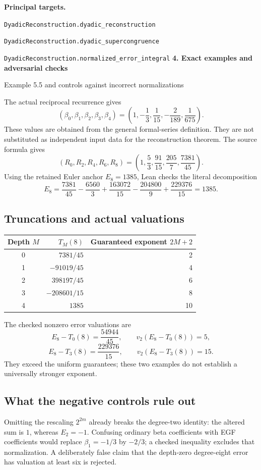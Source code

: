 \documentclass[11pt]{article}
\newcommand{\target}[1]{{\footnotesize\texttt{#1}}}
\newcommand{\pageheading}[2]{{\Large\bfseries\color{ink}#1}\par{\small #2}\par\medskip}
\begin{document}
\textbf{Principal targets.}\par
\target{DyadicReconstruction.dyadic\_reconstruction}\par
\target{DyadicReconstruction.dyadic\_supercongruence}\par
\target{DyadicReconstruction.normalized\_error\_integral}
\newpage
\pageheading{4. Exact examples and adversarial checks}{Example 5.5 and controls against incorrect normalizations}
The actual reciprocal recurrence gives
\[
 (\beta_0,\beta_1,\beta_2,\beta_3,\beta_4)
 =\left(1,-\frac13,\frac1{15},-\frac2{189},\frac1{675}\right).
\]
These values are obtained from the general formal-series definition. They are not substituted as independent input data for the reconstruction theorem. The source formula gives
\[
 (R_0,R_2,R_4,R_6,R_8)
 =\left(1,\frac53,\frac{91}{15},\frac{205}{7},\frac{7381}{45}\right).
\]
Using the retained Euler anchor $E_8=1385$, Lean checks the literal decomposition
\[
 E_8=\frac{7381}{45}-\frac{6560}{3}+\frac{163072}{15}
       -\frac{204800}{9}+\frac{229376}{15}=1385.
\]

\subsection*{Truncations and actual valuations}
\begin{center}
\begin{tabular}{@{}crr@{}}
\toprule
Depth $M$ & $T_M(8)$ & Guaranteed exponent $2M+2$\\\midrule
0 & $7381/45$ & 2\\[3pt]
1 & $-91019/45$ & 4\\[3pt]
2 & $398197/45$ & 6\\[3pt]
3 & $-208601/15$ & 8\\[3pt]
4 & $1385$ & 10\\\bottomrule
\end{tabular}
\end{center}
The checked nonzero error valuations are
\[
 E_8-T_0(8)=\frac{54944}{45},\qquad v_2(E_8-T_0(8))=5,
\]
\[
 E_8-T_3(8)=\frac{229376}{15},\qquad v_2(E_8-T_3(8))=15.
\]
They exceed the uniform guarantees; these two examples do not establish a universally stronger exponent.

\subsection*{What the negative controls rule out}
Omitting the rescaling $2^{2m}$ already breaks the degree-two identity: the altered sum is $1$, whereas $E_2=-1$. Confusing ordinary beta coefficients with EGF coefficients would replace $\beta_1=-1/3$ by $-2/3$; a checked inequality excludes that normalization. A deliberately false claim that the depth-zero degree-eight error has valuation at least six is rejected.
\end{document}
